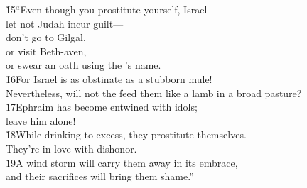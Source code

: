 \begin{poetry}
\poeml \v{15}``Even though you prostitute yourself, Israel--- \\
\poemll    let not Judah incur guilt--- \\
\poeml don't go to Gilgal, \\
\poemll    or visit Beth-aven, \\
\poemlll       or swear an oath using the 's name. \\
\poeml \v{16}For Israel is as obstinate as a stubborn mule! \\
\poemll    Nevertheless, will not the  feed them like a lamb in a broad pasture? \\
\poeml \v{17}Ephraim has become entwined with idols; \\
\poemll    leave him alone! \\
\poeml \v{18}While drinking to excess, they prostitute themselves. \\
\poemll    They're in love with dishonor. \\
\poeml \v{19}A wind storm will carry them away in its embrace, \\
\poemll    and their sacrifices will bring them shame.''
\end{poetry}

